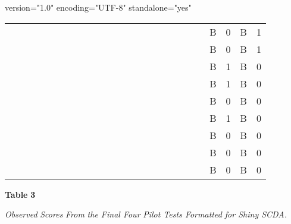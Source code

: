 version="1.0" encoding="UTF-8" standalone="yes" \documentclass{article}
\begin{document}
\begin{table}
\begin{tabular}{c  c  c  c  c  c  c  c  c  c  c  c  c  c  c  c  c  c}
  &   &   &   &   &   &   &   &   &   &   &   &   &   & B & 0 & B & 1\\
  &   &   &   &   &   &   &   &   &   &   &   &   &   & B & 0 & B & 1\\
  &   &   &   &   &   &   &   &   &   &   &   &   &   & B & 1 & B & 0\\
  &   &   &   &   &   &   &   &   &   &   &   &   &   & B & 1 & B & 0\\
  &   &   &   &   &   &   &   &   &   &   &   &   &   & B & 0 & B & 0\\
  &   &   &   &   &   &   &   &   &   &   &   &   &   & B & 1 & B & 0\\
  &   &   &   &   &   &   &   &   &   &   &   &   &   & B & 0 & B & 0\\
  &   &   &   &   &   &   &   &   &   &   &   &   &   & B & 0 & B & 0\\
  &   &   &   &   &   &   &   &   &   &   &   &   &   & B & 0 & B & 0\\


\end{tabular}


\end{table}


\textbf{Table }\textbf{3}

\emph{Observed }\emph{Scores }\emph{From}\emph{ the Final Four}\emph{ Pilot Tests Formatted for Shiny SCDA.}
\end{document}
